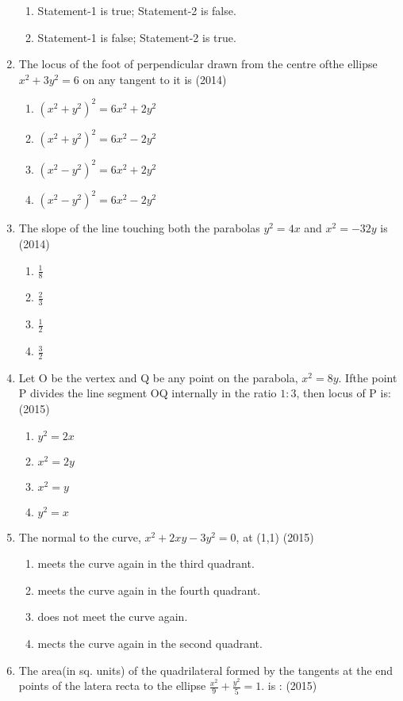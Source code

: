 \documentclass[12pt]{article}
\providecommand{\brak}[1]{\ensuremath{\left(#1\right)}}
\begin{document}
\begin{enumerate}
\begin{enumerate}
\item Statement-1 is true; Statement-2 is false.
\item Statement-1 is false; Statement-2 is true.
\end{enumerate}
\item The locus of the foot of perpendicular drawn from the centre
ofthe ellipse $x^2+3y^2=6$ on any tangent to it is (2014)
\begin{enumerate}
\item $\brak{x^2+y^2}^2=6x^2+2y^2$
\item $\brak{x^2+y^2}^2=6x^2-2y^2$
\item $\brak{x^2-y^2}^2=6x^2+2y^2$
\item $\brak{x^2-y^2}^2=6x^2-2y^2$
\end{enumerate}
\item The slope of the line touching both the parabolas $y^2=4x$ and $x^2=-32y$ is (2014)
\begin{enumerate}
\item $\frac{1}{8}$
\item $\frac{2}{3}$
\item $\frac{1}{2}$
\item $\frac{3}{2}$
\end{enumerate}
\item Let O be the vertex and Q be any point on the parabola, $x^2=8y$. Ifthe point P divides the line segment OQ internally in the ratio $1:3$, then locus of P is: (2015)
\begin{enumerate}
\item $y^2=2x$
\item $x^2=2y$
\item $x^2=y$
\item $y^2=x$
\end{enumerate}
\item  The normal to the curve, $x^2+2xy-3y^2=0$, at (1,1) (2015)
\begin{enumerate}
\item meets the curve again in the third quadrant.
\item meets the curve again in the fourth quadrant.
\item does not meet the curve again.
\item mects the curve again in the second quadrant.
\end{enumerate}
\item The area(in sq. units) of the quadrilateral formed by the tangents at the end points of the latera recta to the ellipse $\frac{x^2}{9}+\frac{y^2}{5}=1$. is : (2015)

\end{enumerate}
\end{document}
